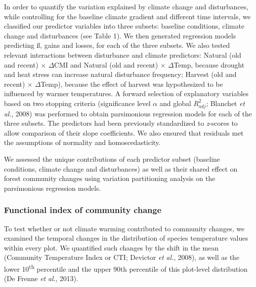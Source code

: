 \documentclass[a4paperpaper,]{article}
\begin{document}
In order to quantify the variation explained by climate change and
disturbances, while controlling for the baseline climate gradient and
different time intervals, we classified our predictor variables into
three subsets: baseline conditions, climate change and disturbances (see
Table 1). We then generated regression models predicting ß, gains and
losses, for each of the three subsets. We also tested relevant
interactions between disturbance and climate predictors: Natural (old
and recent) \(\times\) \(\Delta\)CMI and Natural (old and recent)
\(\times\) \(\Delta\)Temp, because drought and heat stress can increase
natural disturbance frequency; Harvest (old and recent) \(\times\)
\(\Delta\)Temp), because the effect of harvest was hypothesized to be
influenced by warmer temperatures. A forward selection of explanatory
variables based on two stopping criteria (significance level \(\alpha\)
and global \(R^2_{adj}\); Blanchet \emph{et al.}, 2008) was performed to
obtain parsimonious regression models for each of the three subsets. The
predictors had been previously standardized to \emph{z}-scores to allow
comparison of their slope coefficients. We also ensured that residuals
met the assumptions of normality and homoscedasticity.

We assessed the unique contributions of each predictor subset (baseline
conditions, climate change and disturbances) as well as their shared
effect on forest community changes using variation partitioning analysis
on the parsimonious regression models.

\hypertarget{functional-index-of-community-change}{%
\subsubsection{Functional index of community
change}\label{functional-index-of-community-change}}

To test whether or not climate warming contributed to community changes,
we examined the temporal changes in the distribution of species
temperature values within every plot. We quantified such changes by the
shift in the mean (Community Temperature Index or CTI; Devictor \emph{et
al.}, 2008), as well as the lower 10\textsuperscript{th} percentile and
the upper 90th percentile of this plot-level distribution (De Frenne
\emph{et al.}, 2013).
\end{document}
